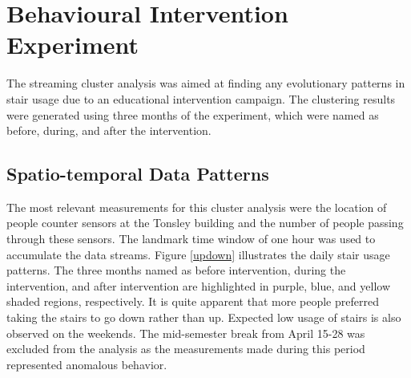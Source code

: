 



 
\section{Behavioural Intervention Experiment} 

The streaming cluster analysis was aimed at finding any evolutionary patterns in stair usage due to an educational intervention campaign. The clustering results were generated using three months of the experiment, which were named as before, during, and after the intervention.


\subsection{Spatio-temporal Data Patterns}


The most relevant measurements for this cluster analysis were the location of people counter sensors at the Tonsley building and the number of people passing through these sensors. The landmark time window of one hour was used to accumulate the data streams. Figure \ref{updown} illustrates the daily stair usage patterns. The three months named as before intervention, during the intervention, and after intervention are highlighted in purple, blue, and yellow shaded regions, respectively. It is quite apparent that more people preferred taking the stairs to go down rather than up. Expected low usage of stairs is also observed on the weekends. The mid-semester break from April 15-28 was excluded from the analysis as the measurements made during this period represented anomalous behavior. 


